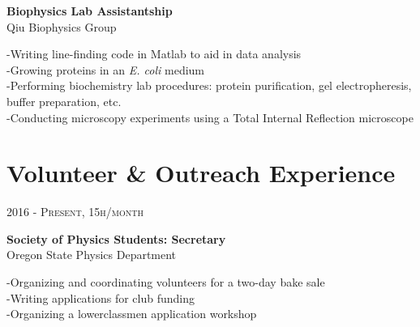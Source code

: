 \documentclass[10pt]{article} %
\begin{document}
{\begin{minipage}[t]{0.5\textwidth}
{\raggedright\large \textbf{Biophysics Lab Assistantship}\\
{Qiu Biophysics Group}\\[5pt]}
\hspace*{0.2in}-Writing line-finding code in Matlab to aid in data analysis\\
\hspace*{0.2in}-Growing proteins in an \textit{E. coli} medium\\
\hspace*{0.2in}-Performing biochemistry lab procedures: protein purification, gel electropheresis, buffer preparation, etc.\\
\hspace*{0.2in}-Conducting microscopy experiments using a Total Internal Reflection microscope




\vspace{0.5cm}
\section{Volunteer \& Outreach Experience} 

{\raggedleft\textsc{2016 - Present, 15h/month}\par}
{\raggedright\large \textbf{Society of Physics Students: Secretary}\\
{Oregon State Physics Department}\\[5pt]}
\hspace*{0.2in}-Organizing and coordinating volunteers for a two-day bake sale\\
\hspace*{0.2in}-Writing applications for club funding\\
\hspace*{0.2in}-Organizing a lowerclassmen application workshop\\


\end{minipage}}
\end{document}
